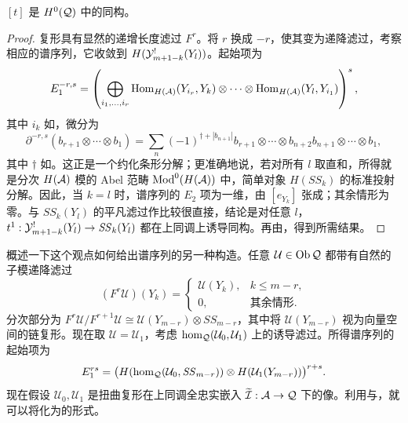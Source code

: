 \begin{lemma}\label{st:5.24}
$[t]$ 是 $H^0(\mathcal Q)$ 中的同构。
\end{lemma}
\begin{proof}
复形具有显然的递增长度滤过 $F^r$。将 $r$ 换成 $-r$，使其变为递降滤过，考察相应的谱序列，它收敛到 $H(\mathcal Y^!_{m+1-k}(Y_l))$。起始项为
\[
E_1^{-r,s}=\left(\bigoplus_{i_1,\ldots,i_r}\operatorname{Hom}_{H(\mathcal A)}(Y_{i_r},Y_k)\otimes\cdots\otimes\operatorname{Hom}_{H(\mathcal A)}(Y_l,Y_{i_1})\right)^s,
\]
其中 $i_k$ 如，微分为
\[
\partial^{-r,s}(b_{r+1}\otimes\cdots\otimes b_1)=\sum_n(-1)^{\dagger+|b_{n+1}|}b_{r+1}\otimes\cdots\otimes b_{n+2}b_{n+1}\otimes\cdots\otimes b_1,
\]
其中 $\dagger$ 如。这正是一个约化条形分解；更准确地说，若对所有 $l$ 取直和，所得就是分次 $H(\mathcal A)$ 模的 Abel 范畴 $\operatorname{Mod}^0(H(\mathcal A))$ 中，简单对象 $H(\mathit{SS}_k)$ 的标准投射分解。因此，当 $k=l$ 时，谱序列的 $E_2$ 项为一维，由 $[e_{Y_k}]$ 张成；其余情形为零。与 $\mathit{SS}_k(Y_l)$ 的平凡滤过作比较很直接，结论是对任意 $l$，$t^1:\mathcal Y^!_{m+1-k}(Y_l)\to\mathit{SS}_k(Y_l)$ 都在上同调上诱导同构。再由，得到所需结果。
\end{proof}
\begin{note}\label{st:5.25}
概述一下这个观点如何给出谱序列的另一种构造。任意 $\mathcal U\in\operatorname{Ob}\mathcal Q$ 都带有自然的子模递降滤过
\[
(F^r\mathcal U)(Y_k)=\begin{cases}\mathcal U(Y_k),&k\leq m-r,\\0,&\text{其余情形}.\end{cases}
\]
分次部分为 $F^r\mathcal U/F^{r+1}\mathcal U\cong\mathcal U(Y_{m-r})\otimes\mathit{SS}_{m-r}$，其中将 $\mathcal U(Y_{m-r})$ 视为向量空间的链复形。现在取 $\mathcal U=\mathcal U_1$，考虑 $\hom_{\mathcal Q}(\mathcal U_0,\mathcal U_1)$ 上的诱导滤过。所得谱序列的起始项为
\begin{equation}\label{eq:5.37}
E_1^{rs}=\bigl(H(\hom_{\mathcal Q}(\mathcal U_0,\mathit{SS}_{m-r}))\otimes H(\mathcal U_1(Y_{m-r}))\bigr)^{r+s}.
\end{equation}
现在假设 $\mathcal U_0,\mathcal U_1$ 是扭曲复形在上同调全忠实嵌入 $\widetilde{\mathcal I}:\mathcal A\to\mathcal Q$ 下的像。利用与，就可以将化为的形式。
\end{note}

